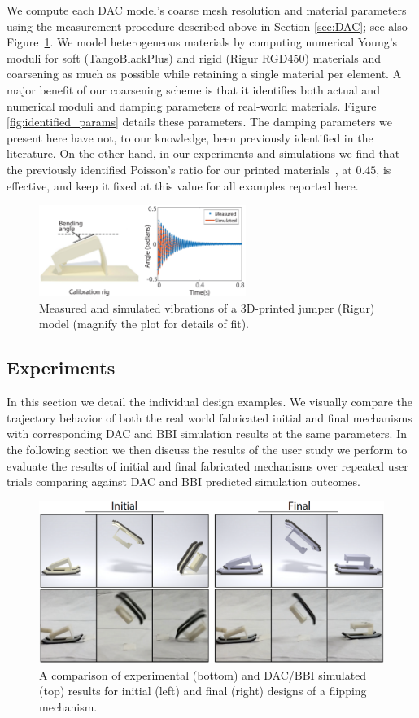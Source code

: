 We compute each DAC model's coarse mesh resolution and material parameters using the measurement procedure described above in Section \ref{sec:DAC}; see also Figure~\ref{fig:vibration_match}. We model heterogeneous materials by computing numerical Young's moduli for soft (TangoBlackPlus) and rigid (Rigur RGD450) materials and coarsening as much as possible while retaining a single material per element. A major benefit of our coarsening scheme is that it identifies both actual and numerical moduli and damping parameters of real-world materials. Figure \ref{fig:identified_params} details these parameters. The damping parameters we present here have not, to our knowledge, been previously identified in the literature. On the other hand, in our experiments and simulations we find that the previously identified Poisson's ratio for our printed materials~\cite{major2011}, at $0.45$, is effective, and keep it fixed at this value for all examples reported here.
\begin{figure}
	\centering
\includegraphics[width=0.6\textwidth]{figs/measure.pdf}
\caption{Measured and simulated vibrations of a 3D-printed jumper (Rigur) model (magnify the plot for details of fit).}
\label{fig:vibration_match}
\end{figure}

\subsection{Experiments}
\label{sec:exp}

In this section we detail the individual design examples. We visually compare the trajectory behavior of both the real world fabricated initial and final mechanisms with corresponding DAC and BBI simulation results at the same parameters.
In the following section we then discuss the results of the user study we perform to evaluate the results of initial and final fabricated mechanisms over repeated user trials comparing against DAC and BBI predicted simulation outcomes.

\begin{figure}[h!]
	\centering
\includegraphics[width=0.7\columnwidth]{images/ResultsFlipper.png}
\caption{A comparison of experimental (bottom) and DAC/BBI simulated (top) results for initial (left) and final (right) designs of a flipping mechanism.}
\label{fig:flipper}	
\end{figure}


